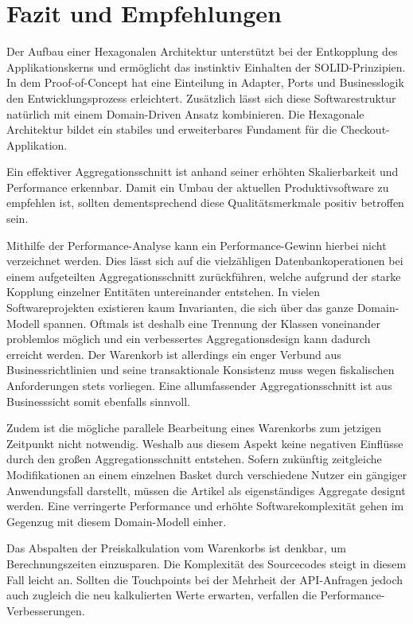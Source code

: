 

\chapter{Fazit und Empfehlungen}

Der Aufbau einer Hexagonalen Architektur unterstützt bei der Entkopplung des Applikationskerns und ermöglicht das instinktiv Einhalten der SOLID-Prinzipien. In dem Proof-of-Concept hat eine Einteilung in Adapter, Ports und Businesslogik den Entwicklungsprozess erleichtert. Zusätzlich lässt sich diese Softwarestruktur natürlich mit einem Domain-Driven Ansatz kombinieren. Die Hexagonale Architektur bildet ein stabiles und erweiterbares Fundament für die Checkout-Applikation.

Ein effektiver Aggregationsschnitt ist anhand seiner erhöhten Skalierbarkeit und Performance erkennbar. Damit ein Umbau der aktuellen Produktivsoftware zu empfehlen ist, sollten dementsprechend diese Qualitätsmerkmale positiv betroffen sein. 

Mithilfe der Performance-Analyse kann ein Performance-Gewinn hierbei nicht verzeichnet werden. Dies lässt sich auf die vielzähligen Datenbankoperationen bei einem aufgeteilten Aggregationsschnitt zurückführen, welche aufgrund der starke Kopplung einzelner Entitäten untereinander entstehen. In vielen Softwareprojekten existieren kaum Invarianten, die sich über das ganze Domain-Modell spannen. Oftmals ist deshalb eine Trennung der Klassen voneinander problemlos möglich und ein verbessertes Aggregationsdesign kann dadurch erreicht werden. Der Warenkorb ist allerdings ein enger Verbund aus Businessrichtlinien und seine transaktionale Konsistenz muss wegen fiskalischen Anforderungen stets vorliegen. Eine allumfassender Aggregationsschnitt ist aus Businesssicht somit ebenfalls sinnvoll.

Zudem ist die mögliche parallele Bearbeitung eines Warenkorbs zum jetzigen Zeitpunkt nicht notwendig. Weshalb aus diesem Aspekt keine negativen Einflüsse durch den großen Aggregationsschnitt entstehen. Sofern zukünftig zeitgleiche Modifikationen an einem einzelnen Basket durch verschiedene Nutzer ein gängiger Anwendungsfall darstellt, müssen die Artikel als eigenständiges Aggregate designt werden. Eine verringerte Performance und erhöhte Softwarekomplexität gehen im Gegenzug mit diesem Domain-Modell einher.

Das Abspalten der Preiskalkulation vom Warenkorbs ist denkbar, um Berechnungszeiten einzusparen. Die Komplexität des Sourcecodes steigt in diesem Fall leicht an. Sollten die Touchpoints bei der Mehrheit der API-Anfragen jedoch auch zugleich die neu kalkulierten Werte erwarten, verfallen die Performance-Verbesserungen. 

